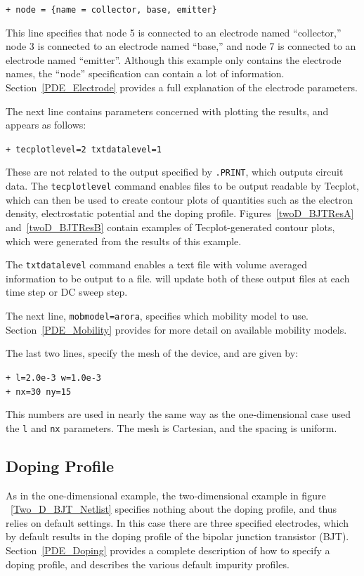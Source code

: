 \texttt{+ node = \{name = collector, base, emitter\} }

This line specifies that node 5 is connected to an electrode named 
``collector,'' node 3 is connected to an electrode named ``base,'' and node 7
is connected to an electrode named ``emitter''.    Although this example only
contains the electrode names, the ``node'' specification
can contain a lot of information. Section~\ref{PDE_Electrode} provides a full explanation of the
electrode parameters.  

The next line contains parameters concerned with plotting the results, and
appears as follows:

\texttt{+ tecplotlevel=2 txtdatalevel=1}

These are not related to the output specified by \texttt{.PRINT}, which outputs circuit data.  
The \texttt{tecplotlevel} command enables files to be output readable by Tecplot,  
which can then be used to create contour plots of 
quantities such as the electron density, electrostatic potential and the
doping profile.  Figures~\ref{twoD_BJTResA} and~\ref{twoD_BJTResB} 
contain examples of Tecplot-generated contour plots, which were generated
from the results of this example.

The \texttt{txtdatalevel} command enables a text file with volume averaged
information to be output to a file.  \Xyce{} will update both of 
these output files at each time step or DC sweep step.

The next line, \texttt{mobmodel=arora}, specifies which mobility model to
use.  Section~\ref{PDE_Mobility} provides for more detail on available mobility models.

The last two lines, specify the mesh of the device, and are given by:

\texttt{+ l=2.0e-3  w=1.0e-3} \\
\texttt{+ nx=30     ny=15}

This numbers are used in nearly the same way as the one-dimensional case used the \texttt{l} and
\texttt{nx} parameters.  The mesh is Cartesian, and the spacing is uniform.  

\subsection{Doping Profile}
As in the one-dimensional example, the two-dimensional example in figure
~\ref{Two_D_BJT_Netlist} specifies nothing about the doping profile, and thus 
relies on default settings.  In this case there are three specified electrodes, 
which by default results in the doping profile of the bipolar junction transistor (BJT).  
Section~\ref{PDE_Doping} provides a complete description of how to specify a 
doping profile, and describes the various default impurity profiles.


